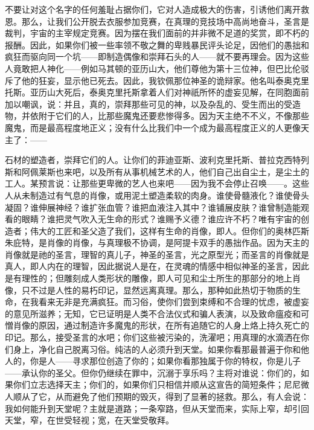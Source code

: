 不要让对这个名字的任何羞耻占据你们，它对人造成极大的伤害，引诱他们离开救恩。那么，让我们公开脱去衣服参加竞赛，在真理的竞技场中高尚地奋斗，圣言是裁判，宇宙的主宰规定竞赛。因为摆在我们面前的并非微不足道的奖赏，即不朽的报酬。因此，如果你们被一些率领不敬之舞的卑贱暴民评头论足，因他们的愚拙和疯狂而驱向同一个坑——即制造偶像和崇拜石头的人——就不要再理会。因为这些人竟敢把人神化——例如马其顿的亚历山大，他们尊他为第十三位神，但巴比伦驳斥了他的狂妄，显示他已死去。因此，我钦佩那位神圣的诡辩家。他名叫泰奥克里托斯。亚历山大死后，泰奥克里托斯拿着人们对神祇所怀的虚妄见解，在同胞面前加以嘲讽，说：并且，真的，崇拜那些可见的神，以及杂乱的、受生而出的受造物，并依附于它们的人，比那些魔鬼还要悲惨得多。因为天主绝不不义，不像那些魔鬼，而是最高程度地正义；没有什么比我们中一个成为最高程度正义的人更像天主了：——\par

\par

石材的塑造者，崇拜它们的人。让你们的菲迪亚斯、波利克里托斯、普拉克西特列斯和阿佩莱斯也来吧，以及所有从事机械艺术的人，他们自己出自尘土，是尘土的工人。某预言说：让那些更卑微的艺人也来吧——因为我不会停止召唤——。这些人从未制造过有气息的肖像，或用泥土塑造柔软的肉身。谁使骨髓液化？谁使骨头凝固？谁伸展神经？谁扩张血管？谁把血液注入其中？谁铺展皮肤？谁曾制造能观看的眼睛？谁把灵气吹入无生命的形式？谁赐予义德？谁应许不朽？唯有宇宙的创造者；伟大的工匠和圣父造了我们，这样有生命的肖像，即人。但你们的奥林匹斯朱庇特，是肖像的肖像，与真理极不协调，是阿提卡双手的愚拙作品。因为天主的肖像就是祂的圣言，理智的真儿子，神圣的圣言，光之原型光；而圣言的肖像就是真人，即人内在的理智，因此据说人是在，在灵魂的情感中相似神圣的圣言，因此是有理性的；但雕刻成人类形状的雕像，即人可见和尘土所生的那部分的地上肖像，只不过是人性的易朽印记，显然远离真理。那么，那种如此热切于物质的生命，在我看来无非是充满疯狂。而习俗，使你们尝到束缚和不合理的忧虑，被虚妄的意见所滋养；无知，它已证明是人类不合法仪式和骗人表演，以及致命瘟疫和可憎肖像的原因，通过制造许多魔鬼的形状，在所有追随它的人身上烙上持久死亡的印记。那么，接受圣言的水吧；你们这些被污染的，洗濯吧；用真理的水滴洒在你们身上，净化自己脱离习俗。纯洁的人必须升到天堂。如果你看那最普遍于你和他人的，你是人——寻求那位创造了你的；如果你看那独属于你的特权，你是儿子——承认你的圣父。但你仍继续在罪中，沉溺于享乐吗？主将对谁说：你们的，如果你们立志选择天主；你们的，如果你们只相信并顺从这宣告的简短条件；尼尼微人顺从了它，从而避免了他们预期的毁灭，得到了显著的拯救。那么，有人会说：我如何能升到天堂呢？主就是道路；一条窄路，但从天堂而来，实际上窄，却引回天堂，窄，在世受轻视；宽，在天堂受敬拜。\par

